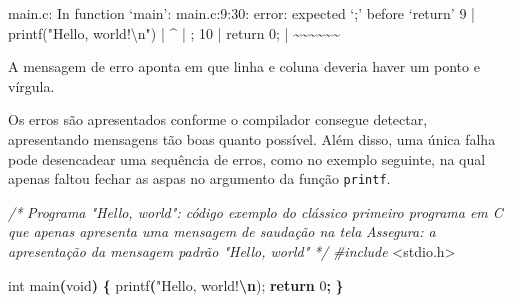\documentclass[
  11pt,
  a4paper,
]{scrbook}
\newenvironment{Shaded}{\begin{snugshade}}{\end{snugshade}}
\newcommand{\CommentTok}[1]{\textcolor[rgb]{0.56,0.35,0.01}{\textit{#1}}}
\newcommand{\ControlFlowTok}[1]{\textcolor[rgb]{0.13,0.29,0.53}{\textbf{#1}}}
\newcommand{\DataTypeTok}[1]{\textcolor[rgb]{0.13,0.29,0.53}{#1}}
\newcommand{\DecValTok}[1]{\textcolor[rgb]{0.00,0.00,0.81}{#1}}
\newcommand{\ImportTok}[1]{#1}
\newcommand{\NormalTok}[1]{#1}
\newcommand{\OperatorTok}[1]{\textcolor[rgb]{0.81,0.36,0.00}{\textbf{#1}}}
\newcommand{\PreprocessorTok}[1]{\textcolor[rgb]{0.56,0.35,0.01}{\textit{#1}}}
\newcommand{\SpecialCharTok}[1]{\textcolor[rgb]{0.81,0.36,0.00}{\textbf{#1}}}
\newcommand{\StringTok}[1]{\textcolor[rgb]{0.31,0.60,0.02}{#1}}
\begin{document}
\begin{Shaded}
\begin{Highlighting}[]
\NormalTok{main.c: In function ‘main’:}
\NormalTok{main.c:9:30: error: expected ‘;’ before ‘return’}
\NormalTok{    9 |     printf("Hello, world!\textbackslash{}n")}
\NormalTok{      |                              \^{}}
\NormalTok{      |                              ;}
\NormalTok{   10 |     return 0;}
\NormalTok{      |     \textasciitilde{}\textasciitilde{}\textasciitilde{}\textasciitilde{}\textasciitilde{}\textasciitilde{}                    }
\end{Highlighting}
\end{Shaded}

A mensagem de erro aponta em que linha e coluna deveria haver um ponto e
vírgula.

Os erros são apresentados conforme o compilador consegue detectar,
apresentando mensagens tão boas quanto possível. Além disso, uma única
falha pode desencadear uma sequência de erros, como no exemplo seguinte,
na qual apenas faltou fechar as aspas no argumento da função
\texttt{printf}.

\begin{Shaded}
\begin{Highlighting}[]
\CommentTok{/*}
\CommentTok{Programa "Hello, world": código exemplo do clássico primeiro programa em C}
\CommentTok{    que apenas apresenta uma mensagem de saudação na tela}
\CommentTok{Assegura: a apresentação da mensagem padrão "Hello, world"}
\CommentTok{*/}
\PreprocessorTok{\#include }\ImportTok{\textless{}stdio.h\textgreater{}}

\DataTypeTok{int}\NormalTok{ main}\OperatorTok{(}\DataTypeTok{void}\OperatorTok{)} \OperatorTok{\{}
\NormalTok{    printf}\OperatorTok{(}\StringTok{"Hello, world!}\SpecialCharTok{\textbackslash{}n}\StringTok{);}
    \ControlFlowTok{return} \DecValTok{0}\OperatorTok{;}
\OperatorTok{\}}
\end{Highlighting}
\end{Shaded}
\end{document}
